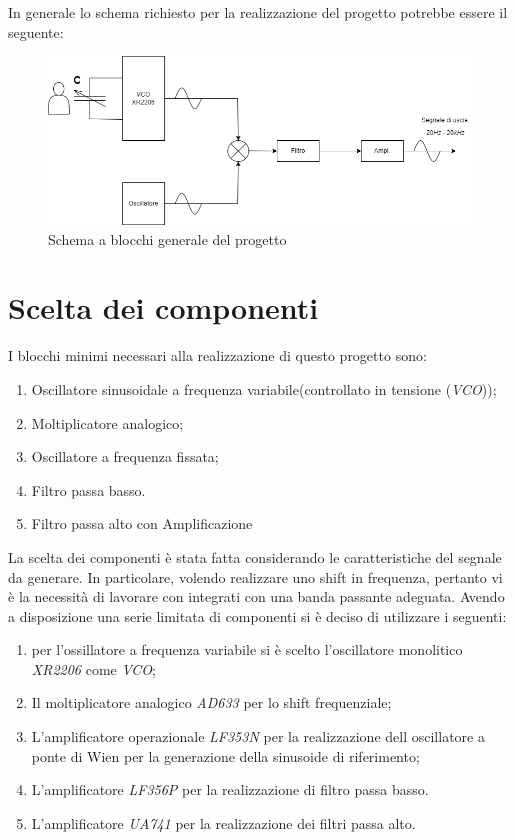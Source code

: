 \documentclass[titlepage]{report}
\begin{document}
	 In generale lo schema richiesto per la realizzazione del progetto potrebbe essere il seguente:
	 
	\begin{figure}[htbp]
		\centering
		\includegraphics[scale=0.5]{Immagini/Schema Generale PSEA.png}
		\caption{Schema a blocchi generale del progetto}
		\label{fig: schema a blocchi generico}
	\end{figure}	


\newpage

	
\chapter{Scelta dei componenti}
	\label{ch:Scelta_componenti}
	I blocchi minimi necessari alla realizzazione di questo progetto sono:
	
	\begin{enumerate}
		\item Oscillatore sinusoidale a frequenza variabile(controllato in tensione (\textit{VCO}));
		\item Moltiplicatore analogico;
		\item Oscillatore a frequenza fissata;
		\item Filtro passa basso.
		\item Filtro passa alto con Amplificazione
	\end{enumerate}
	
	\noindent La scelta dei componenti è stata fatta considerando le caratteristiche del segnale da generare. In particolare, volendo realizzare uno shift in frequenza, pertanto vi è la necessità di lavorare con integrati con una banda passante adeguata.
	Avendo a disposizione una serie limitata di componenti si è deciso di utilizzare i seguenti:
	
	\begin{enumerate}
		\item per l'ossillatore a frequenza variabile si è scelto l'oscillatore monolitico \textit{XR2206} come \textit{VCO};
		\item Il moltiplicatore analogico \textit{AD633} per lo shift frequenziale;
		\item L'amplificatore operazionale \textit{LF353N} per la realizzazione dell oscillatore a ponte di Wien per la generazione della sinusoide di riferimento;
		\item L'amplificatore \textit{LF356P} per la realizzazione di filtro passa basso.
		\item L'amplificatore \textit{UA741} per la realizzazione dei filtri passa alto.
	\end{enumerate}
	
\end{document}
